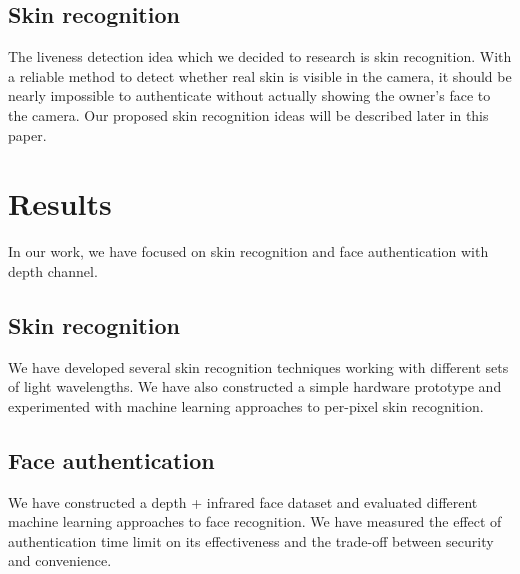         \subsection*{Skin recognition}
            The liveness detection idea which we decided to research is skin recognition.
            With a reliable method to detect whether real skin is visible in the camera,
            it should be nearly impossible to authenticate without actually showing
            the owner's face to the camera.
            Our proposed skin recognition ideas will be described later in this paper.

    \section{Results}
        In our work, we have focused on skin recognition and face authentication
        with depth channel.

        \subsection*{Skin recognition}
            We have developed several skin recognition techniques working with different
            sets of light wavelengths. We have also constructed a simple hardware prototype
            and experimented with machine learning approaches to per-pixel skin recognition.

        \subsection*{Face authentication}
            We have constructed a depth + infrared face dataset and evaluated different
            machine learning approaches to face recognition. We have measured the
            effect of authentication time limit on its effectiveness and the trade-off
            between security and convenience.
